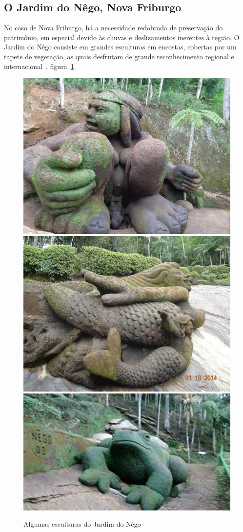 \subsection{O Jardim do Nêgo, Nova Friburgo}
No caso de Nova Friburgo, há a necessidade redobrada de preservação do
patrimônio, em especial devido às chuvas e deslizamentos inerentes à região.  O
Jardim do Nêgo consiste em grandes esculturas em encostas, cobertas por um tapete de
vegetação, as quais desfrutam de grande reconhecimento regional e internacional~\cite{JardimDoNego:TheGuardian},
figura~\ref{fig:esculturas}.

\begin{figure} [!h]
	\centering
	\includegraphics[width=0.3\linewidth]{figs/jardim-do-nego.jpg}
	\includegraphics[width=0.3\linewidth]{figs/jardim-do-nego22.jpg}
	\includegraphics[width=0.35\linewidth]{figs/jardim-do-nego32.jpg}
	\caption{Algumas esculturas do Jardim do Nêgo}\label{fig:esculturas}

\end{figure}


